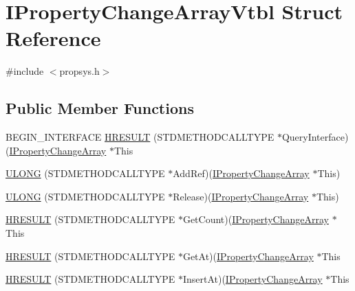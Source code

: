 \hypertarget{struct_i_property_change_array_vtbl}{}\section{I\+Property\+Change\+Array\+Vtbl Struct Reference}
\label{struct_i_property_change_array_vtbl}


{\ttfamily \#include $<$propsys.\+h$>$}

\subsection*{Public Member Functions}
\begin{DoxyCompactItemize}
\item 
B\+E\+G\+I\+N\+\_\+\+I\+N\+T\+E\+R\+F\+A\+CE \hyperlink{struct_i_property_change_array_vtbl_ad80ad60c1f7ea3dbae3bb0b118acd88c}{H\+R\+E\+S\+U\+LT} (S\+T\+D\+M\+E\+T\+H\+O\+D\+C\+A\+L\+L\+T\+Y\+PE $\ast$Query\+Interface)(\hyperlink{propsys_8h_a487ed316865c4f74127303008bf5e18b}{I\+Property\+Change\+Array} $\ast$This
\item 
\hyperlink{struct_i_property_change_array_vtbl_abf640b779b6de14b1cf60e52a605a953}{U\+L\+O\+NG} (S\+T\+D\+M\+E\+T\+H\+O\+D\+C\+A\+L\+L\+T\+Y\+PE $\ast$Add\+Ref)(\hyperlink{propsys_8h_a487ed316865c4f74127303008bf5e18b}{I\+Property\+Change\+Array} $\ast$This)
\item 
\hyperlink{struct_i_property_change_array_vtbl_af9616c81fc06d96641110cd3ada78ef6}{U\+L\+O\+NG} (S\+T\+D\+M\+E\+T\+H\+O\+D\+C\+A\+L\+L\+T\+Y\+PE $\ast$Release)(\hyperlink{propsys_8h_a487ed316865c4f74127303008bf5e18b}{I\+Property\+Change\+Array} $\ast$This)
\item 
\hyperlink{struct_i_property_change_array_vtbl_aa08b6a0b5e461d19f22e2f088f562c68}{H\+R\+E\+S\+U\+LT} (S\+T\+D\+M\+E\+T\+H\+O\+D\+C\+A\+L\+L\+T\+Y\+PE $\ast$Get\+Count)(\hyperlink{propsys_8h_a487ed316865c4f74127303008bf5e18b}{I\+Property\+Change\+Array} $\ast$This
\item 
\hyperlink{struct_i_property_change_array_vtbl_a680d0318b45c38ba7bfb7ab34da4820f}{H\+R\+E\+S\+U\+LT} (S\+T\+D\+M\+E\+T\+H\+O\+D\+C\+A\+L\+L\+T\+Y\+PE $\ast$Get\+At)(\hyperlink{propsys_8h_a487ed316865c4f74127303008bf5e18b}{I\+Property\+Change\+Array} $\ast$This
\item 
\hyperlink{struct_i_property_change_array_vtbl_a847a0ffb9899f1dede2d0713234ed48a}{H\+R\+E\+S\+U\+LT} (S\+T\+D\+M\+E\+T\+H\+O\+D\+C\+A\+L\+L\+T\+Y\+PE $\ast$Insert\+At)(\hyperlink{propsys_8h_a487ed316865c4f74127303008bf5e18b}{I\+Property\+Change\+Array} $\ast$This

\end{DoxyCompactItemize}
